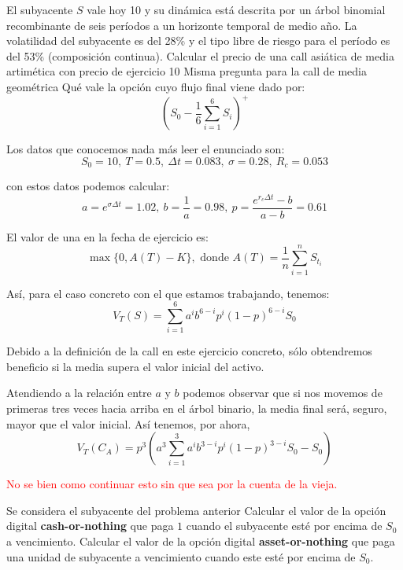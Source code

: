 \begin{problem}[3]
El subyacente $S$ vale hoy 10 y su dinámica está descrita por un árbol binomial recombinante de seis períodos a un horizonte temporal de medio año. La volatilidad del subyacente es del 28\% y el tipo libre de riesgo para el período es del 53\% (composición continua).
\ppart Calcular el precio de una call asiática de media artimética con precio de ejercicio 10
\ppart Misma pregunta para la call de media geométrica
\ppart Qué vale la opción cuyo flujo final viene dado por:
\[(S_0-\frac{1}{6}\sum_{i=1}^6S_i)^+\]
\solution


Los datos que conocemos nada más leer el enunciado son:
\[S_0=10, \ T=0.5, \ Δt = 0.083, \ σ=0.28, \ R_c=0.053\]

con estos datos podemos calcular:
\[a=e^{σΔt} = 1.02, \ b = \frac{1}{a} = 0.98, \ p = \frac{e^{r_cΔt}-b}{a-b}=0.61\]

\spart

El valor de una  en la fecha de ejercicio es:
\[\max\{0, A(T)-K\}, \text{ donde } A(T) = \frac{1}{n} \sum_{i=1}^nS_{t_i}\]

Así, para el caso concreto con el que estamos trabajando, tenemos:
\[V_T(S) = \sum_{i=1}^6a^ib^{6-i}p^i(1-p)^{6-i}S_0\]

Debido a la definición de la call en este ejercicio concreto, sólo obtendremos beneficio si la media supera el valor inicial del activo.

Atendiendo a la relación entre $a$ y $b$ podemos observar que si nos movemos de primeras tres veces hacia arriba en el árbol binario, la media final será, seguro, mayor que el valor inicial. Así tenemos, por ahora,
\[V_T(C_A)=p^3\left(a^3\sum_{i=1}^{3}a^ib^{3-i}p^i(1-p)^{3-i}S_0-S_0\right)\]

\textcolor{red}{No se bien como continuar esto sin que sea por la cuenta de la vieja.}


\end{problem}

\begin{problem}[4]
Se considera el subyacente del problema anterior
\ppart Calcular el valor de la opción digital \textbf{cash-or-nothing} que paga $1$ cuando el subyacente esté por encima de $S_0$ a vencimiento.
\ppart Calcular el valor de la opción digital \textbf{asset-or-nothing} que paga una unidad de subyacente a vencimiento cuando este esté por encima de $S_0$.
\solution

\end{problem}


